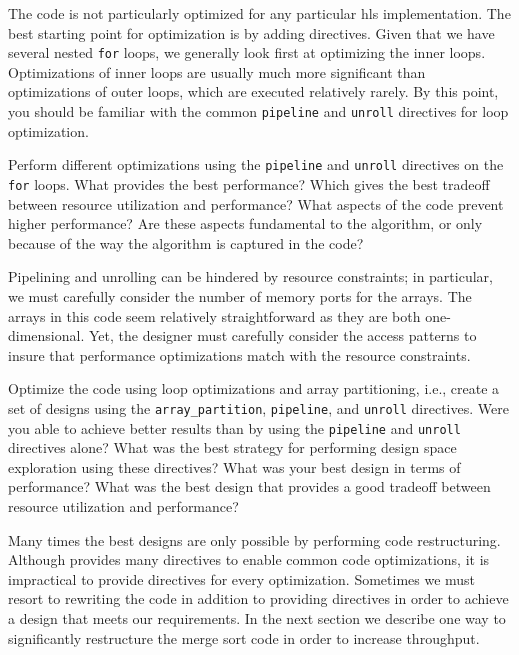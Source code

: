 The code is not particularly optimized for any particular \gls{hls} implementation. The best starting point for optimization is by adding directives. Given that we have several nested \lstinline{for} loops, we generally look first at optimizing the inner loops.  Optimizations of inner loops are usually much more significant than optimizations of outer loops, which are executed relatively rarely. By this point, you should be familiar with the common \lstinline{pipeline} and \lstinline{unroll} directives for loop optimization. 

\begin{exercise}
Perform different optimizations using the \lstinline{pipeline} and \lstinline{unroll} directives on the \lstinline{for} loops. What provides the best performance? Which gives the best tradeoff between resource utilization and performance?  What aspects of the code prevent higher performance?  Are these aspects fundamental to the algorithm, or only because of the way the algorithm is captured in the code?
\end{exercise}

Pipelining and unrolling can be hindered by resource constraints; in particular, we must carefully consider the number of memory ports for the arrays. The arrays in this code seem relatively straightforward as they are both one-dimensional. Yet, the designer must carefully consider the access patterns to insure that performance optimizations match with the resource constraints. 

\begin{exercise}
Optimize the code using loop optimizations and array partitioning, i.e., create a set of designs using the \lstinline{array_partition}, \lstinline{pipeline}, and \lstinline{unroll} directives. Were you able to achieve better results than by using the \lstinline{pipeline} and \lstinline{unroll} directives alone? What was the best strategy for performing design space exploration using these directives? What was your best design in terms of performance? What was the best design that provides a good tradeoff between resource utilization and performance?
\end{exercise}

Many times the best designs are only possible by performing code restructuring. Although \VHLS provides many directives to enable common code optimizations, it is impractical to provide directives for every optimization.  Sometimes we must resort to rewriting the code in addition to providing directives in order to achieve a design that meets our requirements.  In the next section we describe one way to significantly restructure the merge sort code in order to increase throughput.

